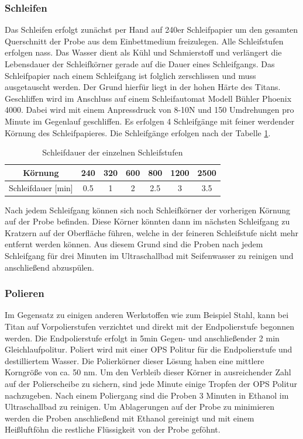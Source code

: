\documentclass[a4paper, 11pt]{tubsreprt}
\begin{document}
\subsubsection{Schleifen}
Das Schleifen erfolgt zunächst per Hand auf 240er Schleifpapier um den gesamten Querschnitt der Probe aus dem Einbettmedium freizulegen. Alle Schleifstufen erfolgen nass. Das Wasser dient als Kühl und Schmierstoff und verlängert die Lebensdauer der Schleifkörner gerade auf die Dauer eines Schleifgangs. Das Schleifpapier nach einem Schleifgang ist folglich zerschlissen und muss ausgetauscht werden. Der Grund hierfür liegt in der hohen Härte des Titans. Geschliffen wird im Anschluss auf einem Schleifautomat Modell Bühler Phoenix 4000. Dabei wird mit einem Anpressdruck von 8-10N und 150 Umdrehungen pro Minute im Gegenlauf geschliffen. Es erfolgen 4 Schleifgänge mit feiner werdender Körnung des Schleifpapieres. Die Schleifgänge erfolgen nach der Tabelle \ref{Tabelle Schleifdauer Körnung}. 
\begin{table}
\begin{tabular}{c|c|c|c|c|c|c}
Körnung & 240 & 320 & 600 & 800 & 1200 & 2500 \\
\hline
Schleifdauer [min] & 0.5 & 1 & 2 & 2.5 & 3 & 3.5 \\
\end{tabular}
\caption{Schleifdauer der einzelnen Schleifstufen}
\label{Tabelle Schleifdauer Körnung}
\end{table}
Nach jedem Schleifgang können sich noch Schleifkörner der vorherigen Körnung auf der Probe befinden. Diese Körner könnten dann im nächsten Schleifgang zu Kratzern auf der Oberfläche führen, welche in der feineren Schleifstufe nicht mehr entfernt werden können. Aus diesem Grund sind die Proben nach jedem Schleifgang für drei Minuten im Ultraschallbad mit Seifenwasser zu reinigen und anschließend abzuspülen. 

\subsubsection{Polieren}
Im Gegensatz zu einigen anderen Werkstoffen wie zum Beispiel Stahl, kann bei Titan auf Vorpolierstufen verzichtet und direkt mit der Endpolierstufe begonnen werden. Die Endpolierstufe erfolgt in  5min Gegen- und anschließender 2 min Gleichlaufpolitur. Poliert wird mit einer OPS Politur für die Endpolierstufe und destilliertem Wasser. Die Polierkörner dieser Lösung haben eine mittlere Korngröße von ca. 50 nm. Um den Verbleib dieser Körner in ausreichender Zahl auf der Polierscheibe zu sichern, sind jede Minute einige Tropfen der OPS Politur nachzugeben. Nach einem Poliergang sind die Proben 3 Minuten in Ethanol im Ultraschallbad zu reinigen. Um Ablagerungen auf der Probe zu minimieren werden die Proben anschließend mit Ethanol gereinigt und mit einem Heißluftföhn die restliche Flüssigkeit von der Probe geföhnt.
\end{document}
